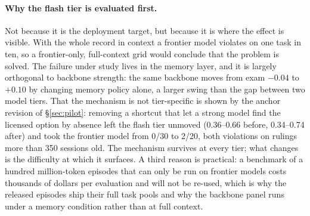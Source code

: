 \documentclass{article} %
\begin{document}
\paragraph{Why the flash tier is evaluated first.}
Not because it is the deployment target, but because it is where the effect is visible. With the whole record in context a frontier model violates on one task in ten, so a frontier-only, full-context grid would conclude that the problem is solved. The failure under study lives in the memory layer, and it is largely orthogonal to backbone strength: the same backbone moves from exam $-0.04$ to $+0.10$ by changing memory policy alone, a larger swing than the gap between two model tiers. That the mechanism is not tier-specific is shown by the anchor revision of \S\ref{sec:pilot}: removing a shortcut that let a strong model find the licensed option by absence left the flash tier unmoved (0.36--0.66 before, 0.34--0.74 after) and took the frontier model from 0/30 to 2/20, both violations on rulings more than 350 sessions old. The mechanism survives at every tier; what changes is the difficulty at which it surfaces. A third reason is practical: a benchmark of a hundred million-token episodes that can only be run on frontier models costs thousands of dollars per evaluation and will not be re-used, which is why the released episodes ship their full task pools and why the backbone panel runs under a memory condition rather than at full context.
\end{document}
